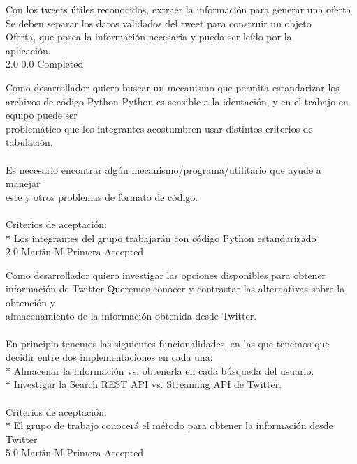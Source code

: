 		{Con los tweets útiles reconocidos, extraer la información para generar una oferta} %
		{Se deben separar los datos validados del tweet para construir un objeto\\
Oferta, que posea la información necesaria y pueda ser leído por la\\
aplicación.\\
} %
		{2.0} %
		{} %
		{0.0} %
		{Completed} %


\vspace{20pt}

	{Como desarrollador quiero buscar un mecanismo que permita estandarizar los archivos de código Python} %
	{Python es sensible a la identación, y en el trabajo en equipo puede ser\\
problemático que los integrantes acostumbren usar distintos criterios de\\
tabulación.\\
  \\
Es necesario encontrar algún mecanismo/programa/utilitario que ayude a manejar\\
este y otros problemas de formato de código.\\
  \\
Criterios de aceptación:\\
* Los integrantes del grupo trabajarán con código Python estandarizado  \\
} %
	{} %
	{2.0} %
	{Martin M} %
	{Primera} %
	{Accepted} %


\vspace{20pt}

	{Como desarrollador quiero investigar las opciones disponibles para obtener información de Twitter} %
	{Queremos conocer y contrastar las alternativas sobre la obtención y\\
almacenamiento de la información obtenida desde Twitter.\\
  \\
En principio tenemos las siguientes funcionalidades, en las que tenemos que\\
decidir entre dos implementaciones en cada una:\\
* Almacenar la información vs. obtenerla en cada búsqueda del usuario.\\
* Investigar la Search REST API vs. Streaming API de Twitter.\\
  \\
Criterios de aceptación:\\
* El grupo de trabajo conocerá el método para obtener la información desde Twitter  \\
} %
	{} %
	{5.0} %
	{Martin M} %
	{Primera} %
	{Accepted} %

